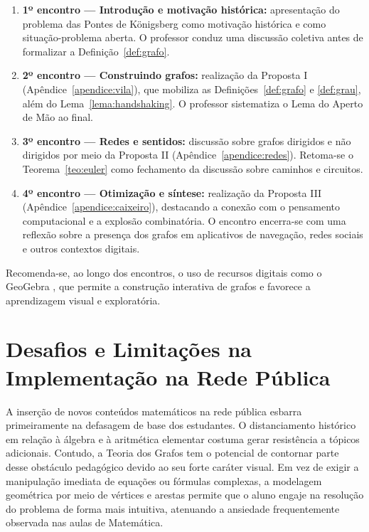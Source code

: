 \documentclass[
  12pt,
  oneside,
  a4paper,
  english,
  brazilian
  ]{abntex2}
\theoremstyle{definition}
\begin{document}
\begin{enumerate}
  \item \textbf{1º encontro --- Introdução e motivação histórica:} apresentação do problema das Pontes de Königsberg como motivação histórica e como situação-problema aberta. O professor conduz uma discussão coletiva antes de formalizar a Definição~\ref{def:grafo}.
  \item \textbf{2º encontro --- Construindo grafos:} realização da Proposta I (Apêndice~\ref{apendice:vila}), que mobiliza as Definições~\ref{def:grafo} e \ref{def:grau}, além do Lema~\ref{lema:handshaking}. O professor sistematiza o Lema do Aperto de Mão ao final.
  \item \textbf{3º encontro --- Redes e sentidos:} discussão sobre grafos dirigidos e não dirigidos por meio da Proposta II (Apêndice~\ref{apendice:redes}). Retoma-se o Teorema~\ref{teo:euler} como fechamento da discussão sobre caminhos e circuitos.
  \item \textbf{4º encontro --- Otimização e síntese:} realização da Proposta III (Apêndice~\ref{apendice:caixeiro}), destacando a conexão com o pensamento computacional e a explosão combinatória. O encontro encerra-se com uma reflexão sobre a presença dos grafos em aplicativos de navegação, redes sociais e outros contextos digitais.
\end{enumerate}

Recomenda-se, ao longo dos encontros, o uso de recursos digitais como o GeoGebra \cite{silva2020}, que permite a construção interativa de grafos e favorece a aprendizagem visual e exploratória.

\section{Desafios e Limitações na Implementação na Rede Pública}

A inserção de novos conteúdos matemáticos na rede pública esbarra primeiramente na defasagem de base dos estudantes. O distanciamento histórico em relação à álgebra e à aritmética elementar costuma gerar resistência a tópicos adicionais. Contudo, a Teoria dos Grafos tem o potencial de contornar parte desse obstáculo pedagógico devido ao seu forte caráter visual. Em vez de exigir a manipulação imediata de equações ou fórmulas complexas, a modelagem geométrica por meio de vértices e arestas permite que o aluno engaje na resolução do problema de forma mais intuitiva, atenuando a ansiedade frequentemente observada nas aulas de Matemática.
\end{document}
